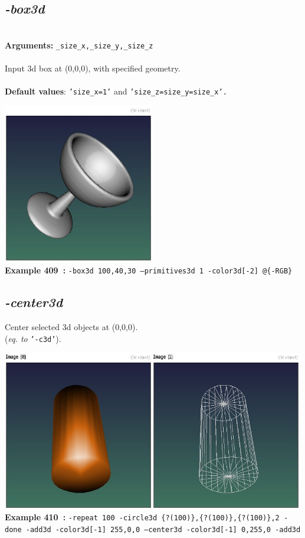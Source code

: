 \documentclass[a4paper,11pt,twoside]{book}
\begin{document}
\subsection{\emph{-box3d} }\vspace*{-0.5em}
~\\\textbf{Arguments: } 
{\small \texttt{\_size\_x,\_size\_y,\_size\_z}}\\~\\
Input 3d box at (0,0,0), with specified geometry.
~\\~\\\textbf{Default values}: {\small \texttt{'size\_x=1'} and \texttt{'size\_z=size\_y=size\_x'.}}
\begin{center}\includegraphics[keepaspectratio=true,height=7cm,width=\textwidth]{img/gmic_def409.jpg}\\
{\footnotesize \textbf{Example 409~:} \texttt{-box3d 100,40,30 --primitives3d 1 -color3d[-2] @\{-RGB\}}}
\end{center}

\subsection{\emph{-center3d} }\vspace*{-0.5em}
Center selected 3d objects at (0,0,0).
~\\(\emph{eq. to} {\small \texttt{'-c3d'}}).
\begin{center}\includegraphics[keepaspectratio=true,height=7cm,width=\textwidth]{img/gmic_def410.jpg}\\
{\footnotesize \textbf{Example 410~:} \texttt{-repeat 100 -circle3d \{?(100)\},\{?(100)\},\{?(100)\},2 -done -add3d -color3d[-1] 255,0,0 --center3d -color3d[-1] 0,255,0 -add3d}}
\end{center}
\end{document}
